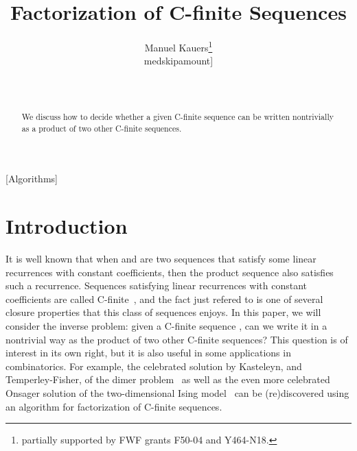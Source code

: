 \documentclass{sig-alternate}
\begin{document}
\title{Factorization of C-finite Sequences}


\author{\alignauthor
 \leavevmode\mathstrut Manuel Kauers\thanks{partially supported by FWF grants F50-04 and Y464-N18.}\\medskipamount]
  \\
  \\
  \\
}

\maketitle
\begin{abstract}
  We discuss how to decide whether a given C-finite sequence
  can be written nontrivially as a product of two other
  C-finite sequences. 
\end{abstract}


[Algorithms]






\section{Introduction}

It is well known that when  and  are two
sequences that satisfy some linear recurrences with constant coefficients, then
the product sequence  also satisfies such a recurrence.
Sequences satisfying linear recurrences with constant coefficients are called
C-finite~\cite{zeilberger90,kauers10j,zeilberger13}, and the fact just refered to is one of several closure
properties that this class of sequences enjoys.  In this paper, we will consider
the inverse problem: given a C-finite sequence , can we
write it in a nontrivial way as the product of two other C-finite sequences?
This question is of interest in its own right, but it is also useful in some
applications in combinatorics.  For example, the celebrated solution by
Kasteleyn, and Temperley-Fisher, of the dimer problem~\cite{fisher61,kasteleyn61} as well as the even
more celebrated Onsager solution of the two-dimensional Ising model~\cite{onsager44}
can be (re)discovered using an algorithm for factorization of C-finite
sequences.
\end{document}
